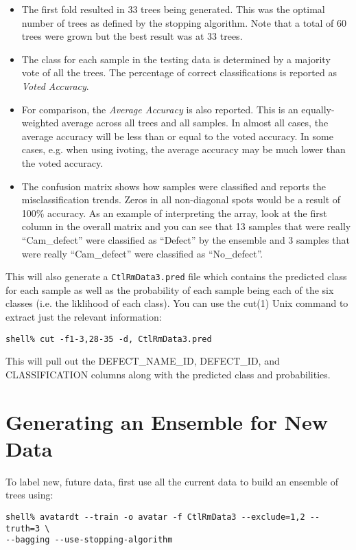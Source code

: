 \documentclass{article}
\begin{document}
\begin{itemize}
\item The first fold resulted in 33 trees being generated. This was the optimal number of trees
as defined by the stopping algorithm. Note that a total of 60 trees were grown but the best
result was at 33 trees.
\item The class for each sample in the testing data is determined by a majority vote of
all the trees. The percentage of correct classifications is reported as \emph{Voted Accuracy}.
\item For comparison, the \emph{Average Accuracy} is also reported. This is an equally-weighted
average across all trees and all samples. In almost all cases, the average accuracy will be
less than or equal to the voted accuracy. In some cases, e.g. when using ivoting, the
average accuracy may be much lower than the voted accuracy.
\item The confusion matrix shows how samples were classified and reports the
misclassification trends. Zeros in all non-diagonal spots would be a result of 100\% accuracy.
As an example of interpreting the array, look at the first column in the overall
matrix and you can see that
13 samples that were really ``Cam\_defect'' were classified as ``Defect'' by the ensemble and
3 samples that were really ``Cam\_defect'' were classified as ``No\_defect''.
\end{itemize}

This will also generate a \verb=CtlRmData3.pred= file which contains the predicted class
for each sample as well as the probability of each sample being each of the six classes (i.e.
the liklihood of each class). You can use the cut(1) Unix command to extract just the
relevant information:

\begin{verbatim}
shell% cut -f1-3,28-35 -d, CtlRmData3.pred
\end{verbatim}

This will pull out the  DEFECT\_NAME\_ID, DEFECT\_ID, and CLASSIFICATION columns along with the
predicted class and probabilities.

\section{Generating an Ensemble for New Data}

To label new, future data, first use all the current data to build an ensemble of trees using:

\begin{verbatim}
shell% avatardt --train -o avatar -f CtlRmData3 --exclude=1,2 --truth=3 \
--bagging --use-stopping-algorithm
\end{verbatim}
\end{document}
